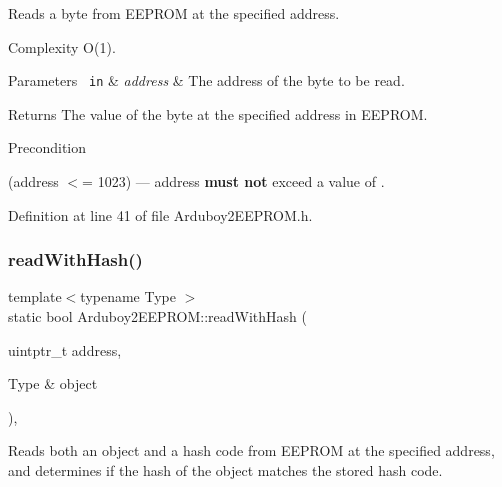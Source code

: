 Reads a byte from E\+E\+P\+R\+OM at the specified address. 

\begin{DoxyParagraph}{Complexity}
{\ttfamily O(1)}.
\end{DoxyParagraph}

\begin{DoxyParams}[1]{Parameters}
\mbox{\texttt{ in}}  & {\em address} & The address of the byte to be read.\\
\hline
\end{DoxyParams}
\begin{DoxyReturn}{Returns}
The value of the byte at the specified address in E\+E\+P\+R\+OM.
\end{DoxyReturn}
\begin{DoxyPrecond}{Precondition}
\begin{DoxyItemize}
\item {\ttfamily (address $<$= 1023)} --- {\ttfamily address} {\bfseries{must not}} exceed a value of {}. \end{DoxyItemize}

\end{DoxyPrecond}


Definition at line 41 of file Arduboy2\+E\+E\+P\+R\+O\+M.\+h.

\mbox{\label{classArduboy2EEPROM_abbfe69135a48dc52120d209bfba38b7a}} 
\subsubsection{\texorpdfstring{readWithHash()}{readWithHash()}\hspace{0.1cm}{\footnotesize\ttfamily [1/2]}}
{\footnotesize\ttfamily template$<$typename Type $>$ \\
static bool Arduboy2\+E\+E\+P\+R\+O\+M\+::read\+With\+Hash (\begin{DoxyParamCaption}\item[{uintptr\+\_\+t}]{address,  }\item[{Type \&}]{object }\end{DoxyParamCaption})\hspace{0.3cm}{\ttfamily [inline]}, {\ttfamily [static]}}



Reads both an object and a hash code from E\+E\+P\+R\+OM at the specified address, and determines if the hash of the object matches the stored hash code. 

